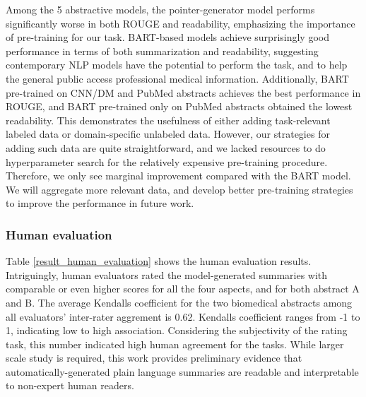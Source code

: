 \documentclass[letterpaper, table]{article} %
\begin{document}
Among the 5 abstractive models, the pointer-generator model performs significantly worse in both ROUGE and readability, emphasizing the importance of pre-training for our task.
BART-based models achieve surprisingly good performance in terms of both summarization and readability, suggesting contemporary NLP models have the potential to perform the task, and to help the general public access professional medical information. Additionally, BART pre-trained on CNN/DM and PubMed abstracts achieves the best performance in ROUGE, and BART pre-trained only on PubMed abstracts obtained the lowest readability.
This demonstrates the usefulness of either adding task-relevant labeled data or domain-specific unlabeled data. However, our strategies for adding such data are quite straightforward, and we lacked resources to do hyperparameter search for the relatively expensive pre-training procedure. Therefore, we only see marginal improvement compared with the BART model. We will aggregate more relevant data, and develop better pre-training strategies to improve the performance in future work.

\subsubsection{Human evaluation}
Table \ref{result_human_evaluation} shows the human evaluation results. Intriguingly, human evaluators rated the model-generated summaries with comparable or even higher scores for all the four aspects, and for both abstract A and B. The average Kendalls coefficient \cite{sen1968estimates} for the two biomedical abstracts among all evaluators' inter-rater aggrement is 0.62. Kendalls coefficient ranges from -1 to 1, indicating low to high association. Considering the subjectivity of the rating task, this number indicated high human agreement for the tasks.
While larger scale study is required,
\vspace{-1.66mm}
\vspace{-4.97mm}
\vspace{-6.63mm}
this work provides preliminary evidence that automatically-generated plain language summaries
are readable and interpretable to non-expert human readers.
\vspace{-3.27mm}
\end{document}
